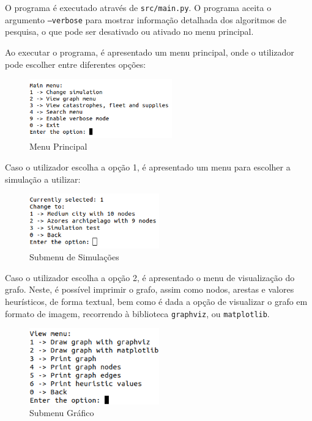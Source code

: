 \documentclass[a4paper,12pt]{scrreprt}
\begin{document}
O programa é executado através de \texttt{src/main.py}.
O programa aceita o argumento \texttt{--verbose} para mostrar informação detalhada dos algoritmos de pesquisa,
o que pode ser desativado ou ativado no menu principal.

Ao executar o programa, é apresentado um menu principal, onde o utilizador pode escolher entre diferentes opções:
\begin{figure}[H]
    \centering
    \includegraphics[width=0.55\textwidth]{img/main_menu.png}
    \caption{Menu Principal}
    \label{fig:menu}
\end{figure}

Caso o utilizador escolha a opção 1, é apresentado um menu para escolher a simulação a utilizar:

\begin{figure}[H]
    \centering
    \includegraphics[width=0.5\textwidth]{img/change_simulation.png}
    \caption{Submenu de Simulações}
    \label{fig:change_simulation}
\end{figure}

\clearpage

Caso o utilizador escolha a opção 2, é apresentado o menu de visualização do grafo.
Neste, é possível imprimir o grafo, assim como nodos, arestas e valores heurísticos, de forma textual, bem como
é dada a opção de visualizar o grafo em formato de imagem, recorrendo à biblioteca \texttt{graphviz}, 
ou \texttt{matplotlib}.

\begin{figure}[H]
    \centering
    \includegraphics[width=0.5\textwidth]{img/graph_menu.png}
    \caption{Submenu Gráfico}
    \label{fig:graph_menu}
\end{figure}
\end{document}
